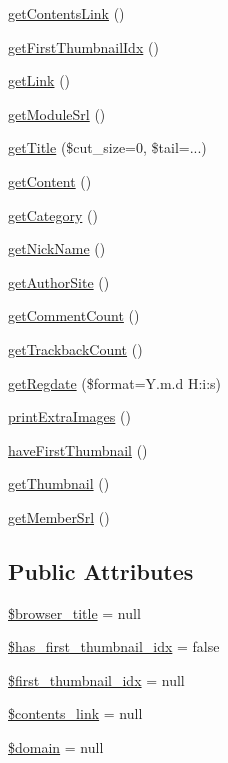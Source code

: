 \begin{DoxyCompactItemize}
\hyperlink{classmcontentItem_a60fe1f5cbd47314c2910a8782a3252a9}{get\+Contents\+Link} ()
\item 
\hyperlink{classmcontentItem_acb7e5ab4fbeac716585618eba64960aa}{get\+First\+Thumbnail\+Idx} ()
\item 
\hyperlink{classmcontentItem_a5a2cad58644aabb016942e427998f32c}{get\+Link} ()
\item 
\hyperlink{classmcontentItem_a9b9841e39ff3ee331679270f9e075203}{get\+Module\+Srl} ()
\item 
\hyperlink{classmcontentItem_a180633138fb77537e7da900074aa7454}{get\+Title} (\$cut\+\_\+size=0, \$tail=\textquotesingle{}...\textquotesingle{})
\item 
\hyperlink{classmcontentItem_a19b333e6ff14db6f7f77c3f94471bdff}{get\+Content} ()
\item 
\hyperlink{classmcontentItem_ae8d1d6e76cc1cfa79d544d47acaedbcc}{get\+Category} ()
\item 
\hyperlink{classmcontentItem_a8182db3f99934760d5f52082b233a1cb}{get\+Nick\+Name} ()
\item 
\hyperlink{classmcontentItem_a90fc323e4d3cf2661e6af5e51babd05f}{get\+Author\+Site} ()
\item 
\hyperlink{classmcontentItem_ac60221ec5be0a8158c5248c09efd8fb1}{get\+Comment\+Count} ()
\item 
\hyperlink{classmcontentItem_afb955c421fa34f36c51edd795d3a00c7}{get\+Trackback\+Count} ()
\item 
\hyperlink{classmcontentItem_a0b13a7bf2aff3c032a929559eaf6ddd6}{get\+Regdate} (\$format=\textquotesingle{}Y.\+m.\+d H\+:i\+:s\textquotesingle{})
\item 
\hyperlink{classmcontentItem_a0cd7ac4bbaf7e7561f5597920c691f9d}{print\+Extra\+Images} ()
\item 
\hyperlink{classmcontentItem_ac8b5fb3d84cdc8a96a8c02e9472e25dd}{have\+First\+Thumbnail} ()
\item 
\hyperlink{classmcontentItem_a25e5c63dceabc33afe0b5ce5b3ddafcf}{get\+Thumbnail} ()
\item 
\hyperlink{classmcontentItem_ab7ad6741a93ab7d631f78bf1253f6800}{get\+Member\+Srl} ()
\end{DoxyCompactItemize}
\subsection*{Public Attributes}
\begin{DoxyCompactItemize}
\item 
\hyperlink{classmcontentItem_afdef241bedb2d1829475b7bb623cecf7}{\$browser\+\_\+title} = null
\item 
\hyperlink{classmcontentItem_a8c95afa6c7bcad64626c9f343e77cdd4}{\$has\+\_\+first\+\_\+thumbnail\+\_\+idx} = false
\item 
\hyperlink{classmcontentItem_a358e826e3ee863300d43b12a8218a5fa}{\$first\+\_\+thumbnail\+\_\+idx} = null
\item 
\hyperlink{classmcontentItem_afdee32faf59897fa7e02f9ed4389b411}{\$contents\+\_\+link} = null
\item 
\hyperlink{classmcontentItem_ad92b662d98d23cb2a10747de7ffdada0}{\$domain} = null
\end{DoxyCompactItemize}



